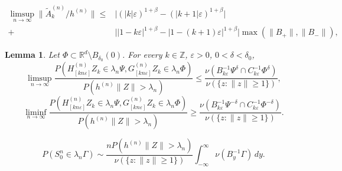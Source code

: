 \documentclass[10pt,a4paper]{amsart}
\newtheorem{lemma}{Lemma}
\newcommand{\RR}{\mathbb{R}}
\newcommand{\ZZ}{\mathbb{Z}}
\newcommand{\bbz}{\ZZ}
\newcommand{\eps}{\varepsilon}
\begin{document}
\begin{equation}\label{eq:coeff_group_err}
\begin{aligned}
\limsup_{n\to\infty} \|\tilde{A}_k^{(n)}/h^{(n)}\| \leq&  \big|(|k| \eps)^{ 1 + \beta}  -
(|k+1|\eps)^{1 + \beta} \big| \\
+& \big||1 - k\eps|^{1 + \beta} - |1 - (k+1)
\eps|^{ 1 + \beta}\big|\max ( \|B _+\|,\|B_-\|), 
\end{aligned}
\end{equation}

\begin{lemma}\label{lemma:asym_lim_meas}
Let $\Phi\subset \RR^d \setminus B_{\delta_0}(0)$. For every $k\in\bbz$, $\eps > 0$, $0< \delta<\delta_0$, 
 $$\limsup_{n\to \infty} \frac{  P({H_{[kn\eps]}^{(n)}} Z_k \in \lambda_n
   \Psi, G_{[kn\eps]}^{(n)} Z_k \in \lambda_n \Phi)}{P(h^{(n)} \|Z\| > \lambda_n)} \leq \frac{
   \nu(B_{k\eps}^{-1}\Psi^{\delta} \cap C_{k\eps}^{-1}\Phi^{\delta})}{\nu(\{z: 
   \|z\| \geq 1\})},
 $$
 $$
\liminf_{n\to \infty} \frac{  P({H_{[kn\eps]}^{(n)}} Z_k \in \lambda_n
   \Psi, G_{[kn\eps]}^{(n)} Z_k \in \lambda_n \Phi)}{P(h^{(n)} \|Z\| > \lambda_n)} \geq \frac{  \nu(B_{k\eps}^{-1}\Psi^{-\delta} \cap C_{k\eps}^{-1} \Phi^{-\delta})}{\nu(\{z: \|z\| \geq 1\})}.$$

 
\end{lemma}

    \begin{equation}\label{eq:asym_equivalence}
        {P(S_0^n \in \lambda_n \Gamma)} \sim \frac{n P(h^{(n)} \|Z\| >
          \lambda_n)}{\nu(\{z: \|z\|\geq 1\})}  \int_{-\infty}^\infty
        \nu (B_y^{-1}\Gamma) \, dy. 
    \end{equation}
\end{document}
